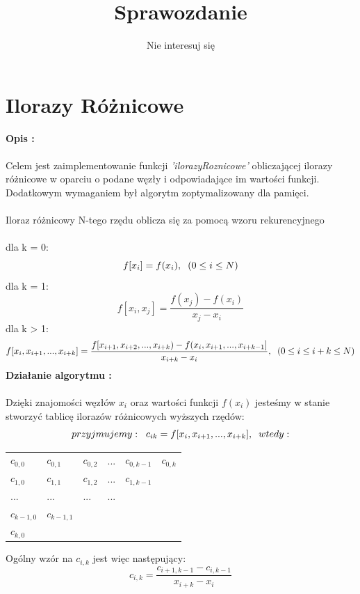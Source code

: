\documentclass{article}
\author{Nie interesuj się}
\title{\vspace{-2.0cm}Sprawozdanie}
\begin{document}
\maketitle
\section*{Ilorazy Różnicowe}
\noindent \textbf{Opis : }\\\\
Celem jest zaimplementowanie funkcji \textit{'ilorazyRoznicowe'} obliczającej ilorazy różnicowe w oparciu o podane węzły i odpowiadające im wartości funkcji. Dodatkowym wymaganiem był algorytm zoptymalizowany dla pamięci.\\\\
Iloraz różnicowy N-tego rzędu oblicza się za pomocą wzoru rekurencyjnego\\\\
dla k = 0:
$$f[x_i] = f(x_i),\hspace*{0,2cm} (0 \leq i \leq N)$$
dla k = 1:
$$f[x_i,x_j] = \frac{f(x_j)-f(x_i)}{x_j - x_i}$$
dla k > 1:
$$f[x_i,x_{i+1},...,x_{i+k}] = \frac{f[x_{i+1},x_{i+2},...,x_{i+k})-f(x_i,x_{i+1},...,x_{i+k-1}]}{x_{i+k} - x_i}, \hspace*{0,2cm} (0 \leq i \leq i+k \leq N)$$
\noindent \textbf{Działanie algorytmu : }\\\\
Dzięki znajomości węzłów $x_i$ oraz wartości funkcji $f(x_i)$ jesteśmy w stanie stworzyć tablicę ilorazów różnicowych wyższych rzędów:
$$przyjmujemy : \hspace*{0,2cm} c_{ik} = f[x_i,x_{i+1},...,x_{i+k}],\hspace*{0,2cm} wtedy:$$
\begin{center}
	\begin{tabular}{p{2cm} p{2cm} p{2cm} p{2cm} p{2cm} p{2cm}}
		$c_{0,0}$ & $c_{0,1}$ & $c_{0,2}$ & $...$ & $c_{0,k-1}$ & $c_{0,k}$  \\
		$c_{1,0}$ & $c_{1,1}$ & $c_{1,2}$ & $...$ & $c_{1,k-1}$  & $ $ \\
		$...$ & $...$ & $...$ & $...$ & $ $ & $ $ \\
		$c_{k-1,0}$ & $c_{k-1,1}$ & $ $ & $ $ & $ $ & $ $  \\
		$c_{k,0}$ & $ $ & $ $ & $ $ & $ $ & $ $ \\
	\end{tabular}
\end{center}
Ogólny wzór na $c_{i,k}$ jest więc następujący:
$$c_{i,k} = \frac{c_{i+1,k-1}-c_{i,k-1}}{x_{i+k}-x_i}$$
\end{document}
